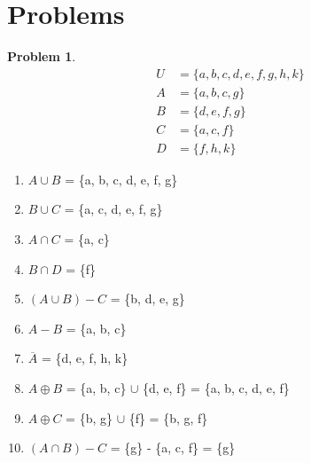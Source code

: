 \documentclass{article}
\theoremstyle{definition}
\newtheorem{problem}{Problem}[section]
\begin{document}
\section{Problems}  %

\begin{problem}
\[
    \begin{aligned}
        U &= \{a, b, c, d, e, f, g, h, k\}\\
        A &= \{a, b, c, g\}\\
        B &= \{d, e, f, g\}\\
        C &= \{a, c, f\}\\
        D &= \{f, h, k\}
    \end{aligned}
\]
    \begin{enumerate}[label=(\alph*)]
        Compute

        \item \(A \cup B\) = \{a, b, c, d, e, f, g\}
        \item \(B \cup C\) = \{a, c, d, e, f, g\}
        \item \(A \cap C\) = \{a, c\}
        \item \(B \cap D\) = \{f\}
        \item \((A\cup B)-C\) = \{b, d, e, g\}
        \item \(A-B\) = \{a, b, c\}
        \item \(\overline{A}\) = \{d, e, f, h, k\}
        \item \(A \oplus B\) = \{a, b, c\} $\cup$ \{d, e, f\} = \{a, b, c, d, e, f\}
        \item \(A \oplus C\) = \{b, g\} $\cup$ \{f\} = \{b, g, f\}
        \item \((A\cap B)-C\) = \{g\} - \{a, c, f\} = \{g\}
    \end{enumerate}
\end{problem}
\end{document}
